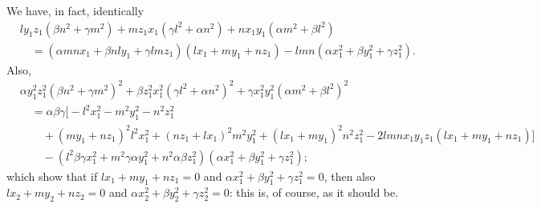 \documentclass[11pt,a4paper]{article}
\begin{document}
We have, in fact, identically
\begin{align*}
& l y_1 z_1 (\beta n^2 + \gamma m^2) + m z_1 x_1 (\gamma l^2 + \alpha n^2) + n x_1 y_1 (\alpha m^2 + \beta l^2)\\
&\quad = (\alpha m n x_1 + \beta n l y_1 + \gamma l m z_1)(l x_1 + m y_1 + n z_1) - lmn (\alpha x_1^2 + \beta y_1^2 + \gamma z_1^2).
\end{align*}
Also,
\begin{align*}
& \alpha y_1^2 z_1^2 (\beta n^2 + \gamma m^2)^2 + \beta z_1^2 x_1^2 (\gamma l^2 + \alpha n^2)^2 + \gamma x_1^2 y_1^2 (\alpha m^2 + \beta l^2)^2\\
&\quad = \alpha\beta\gamma\bigl[ - l^2 x_1^2 - m^2 y_1^2 - n^2 z_1^2 \\
&\qquad + (m y_1 + n z_1)^2 l^2 x_1^2 + (n z_1 + l x_1)^2 m^2 y_1^2 + (l x_1 + m y_1)^2 n^2 z_1^2 - 2 lmn x_1 y_1 z_1 (l x_1 + m y_1 + n z_1)\bigr]\\
&\qquad - (l^2 \beta\gamma x_1^2 + m^2 \gamma\alpha y_1^2 + n^2 \alpha\beta z_1^2)(\alpha x_1^2 + \beta y_1^2 + \gamma z_1^2);
\end{align*}
which show that if $l x_1 + m y_1 + n z_1 = 0$ and $\alpha x_1^2 + \beta y_1^2 + \gamma z_1^2 = 0$, then also $l x_2 + m y_2 + n z_2 = 0$ and $\alpha x_2^2 + \beta y_2^2 + \gamma z_2^2 = 0$: this is, of course, as it should be.

\medskip
\end{document}
